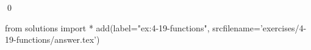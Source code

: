 
\begin{ex}
  \label{ex:4-19-functions}
  
  \qed
\end{ex}
\begin{python0}
from solutions import *
add(label="ex:4-19-functions",
    srcfilename='exercises/4-19-functions/answer.tex')
\end{python0}
